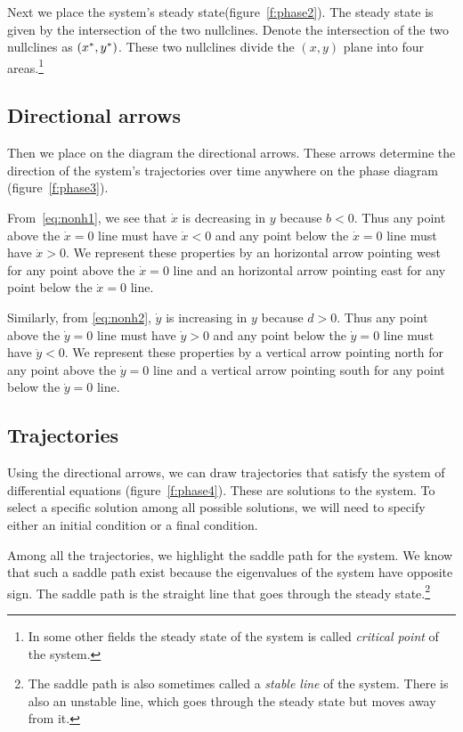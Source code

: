 \documentclass[letterpaper,12pt,leqno]{article}
\begin{document}
Next we place the system's steady state(figure~\ref{f:phase2}). The steady state is given by the intersection of the two nullclines. Denote the intersection of the two nullclines as $\left( x^{*},y^{*} \right) $. These two nullclines divide the $(x,y)$ plane into four areas.\footnote{In some other fields the steady state of the system is called \textit{critical point} of the system.}

\subsection{Directional arrows}

Then we place on the diagram the directional arrows. These arrows determine the direction of the system's trajectories over time anywhere on the phase diagram (figure~\ref{f:phase3}). 

From~\eqref{eq:nonh1}, we see that $\dot{x}$ is decreasing in $y$ because $b<0$. Thus any point above the $\dot{x}=0$ line must have $\dot{x}<0$ and any point below the $\dot{x}=0$ line must have $\dot{x}>0$. We represent these properties by an horizontal arrow pointing west for any point above the $\dot{x}=0$ line and an horizontal arrow pointing east for any point below the $\dot{x}=0$ line. 

Similarly, from \eqref{eq:nonh2}, $\dot{y}$ is increasing in $y$ because $d>0$. Thus any point above the $\dot{y}=0$ line must have $\dot{y}>0$ and any point below the $\dot{y}=0$ line must have $\dot{y}<0$. We represent these properties by a vertical arrow pointing north for any point above the $\dot{y}=0$ line and a vertical arrow pointing south for any point below the $\dot{y}=0$ line. 


\subsection{Trajectories}

Using the directional arrows, we can draw trajectories that satisfy the system of differential equations (figure~\ref{f:phase4}). These are solutions to the system. To select a specific solution among all possible solutions, we will need to specify either an initial condition or a final condition.

Among all the trajectories, we highlight the saddle path for the system. We know that such a saddle path exist because the eigenvalues of the system have opposite sign. The saddle path is the straight line that goes through the steady state.\footnote{The saddle path is also sometimes called a \textit{stable line} of the system. There is also an unstable line, which goes through the steady state but moves away from it.}
\end{document}
